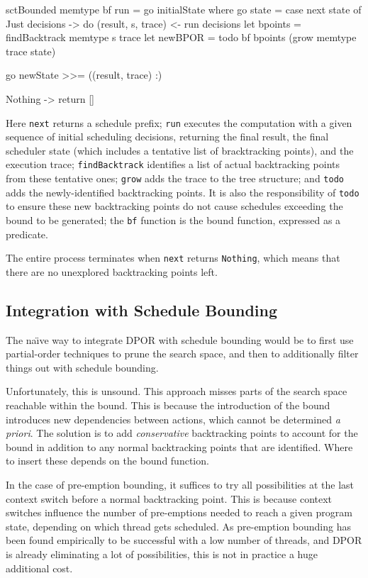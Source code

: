 \begin{haskellcode}
sctBounded memtype bf run = go initialState where
  go state = case next state of
    Just decisions -> do
      (result, s, trace) <- run decisions
      let bpoints = findBacktrack memtype s trace
      let newBPOR = todo bf bpoints (grow memtype trace state)

      go newState >>= ((result, trace) :)

    Nothing -> return []
\end{haskellcode}

Here \verb|next| returns a schedule prefix; \verb|run| executes the
computation with a given sequence of initial scheduling decisions,
returning the final result, the final scheduler state (which includes
a tentative list of bracktracking points), and the execution trace;
\verb|findBacktrack| identifies a list of actual backtracking points
from these tentative ones; \verb|grow| adds the trace to the tree
structure; and \verb|todo| adds the newly-identified backtracking
points. It is also the responsibility of \verb|todo| to ensure these
new backtracking points do not cause schedules exceeding the bound to
be generated; the \verb|bf| function is the bound function, expressed
as a predicate.

The entire process terminates when \verb|next| returns \verb|Nothing|,
which means that there are no unexplored backtracking points left.

\subsection{Integration with Schedule Bounding}
\label{sec:sct-por-bounding}

The na\"{\i}ve way to integrate DPOR with schedule bounding would be
to first use partial-order techniques to prune the search space, and
then to additionally filter things out with schedule bounding.

Unfortunately, this is unsound. This approach misses parts of the
search space reachable within the bound. This is because the
introduction of the bound introduces new dependencies between actions,
which cannot be determined \emph{a priori}. The solution is to add
\emph{conservative} backtracking points to account for the bound in
addition to any normal backtracking points that are identified. Where
to insert these depends on the bound function.

In the case of pre-emption bounding, it suffices to try all
possibilities at the last context switch before a normal backtracking
point. This is because context switches influence the number of
pre-emptions needed to reach a given program state, depending on which
thread gets scheduled. As pre-emption bounding has been found
empirically to be successful with a low number of threads, and DPOR is
already eliminating a lot of possibilities, this is not in practice a
huge additional cost.

